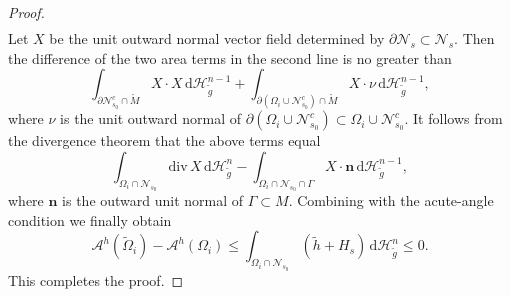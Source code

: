 \documentclass[11pt,letterpaper]{amsart}
\numberwithin{equation}{section}
\theoremstyle{definition}
\begin{document}
\begin{proof}
{\[\begin{split}
\end{split}
\]
Let $X$ be the unit outward normal vector field determined by $\partial \mathcal N_s\subset \mathcal N_s$. Then the difference of the two area terms in the second line is no greater than
$$
\int_{\partial\mathcal N_{s_0}^c\cap \mathring M}X\cdot X\,\mathrm d\mathcal H^{n-1}_{\tilde g}
+\int_{\partial (\Omega_i\cup \mathcal N_{s_0}^c)\cap \mathring M} X\cdot \nu\,\mathrm d\mathcal H^{n-1}_{\tilde g},
$$
where $\nu$ is the unit outward normal of $\partial (\Omega_i\cup \mathcal N_{s_0}^c)\subset \Omega_i\cup \mathcal N_{s_0}^c$.} It follows from the divergence theorem that the above terms equal
$$
\int_{\Omega_i\cap \mathcal N_{s_0}}\mathrm{div}\, X\,\mathrm d\mathcal H^n_{\tilde g}-\int_{\Omega_i\cap \mathcal N_{s_0}\cap \Gamma}X\cdot \mathbf n\,\mathrm d\mathcal H^{n-1}_{\tilde g},
$$
where $\mathbf n$ is the outward unit normal of $\Gamma\subset M$. Combining with the acute-angle condition we finally obtain
$$
\mathcal A^h(\tilde \Omega_i)-\mathcal A^h(\Omega_i)\leq \int_{\Omega_i\cap \mathcal N_{s_0}}(\tilde h+H_s)\,\mathrm d\mathcal H^n_{\tilde g}\leq 0.
$$
This completes the proof.


\end{proof}
\end{document}

